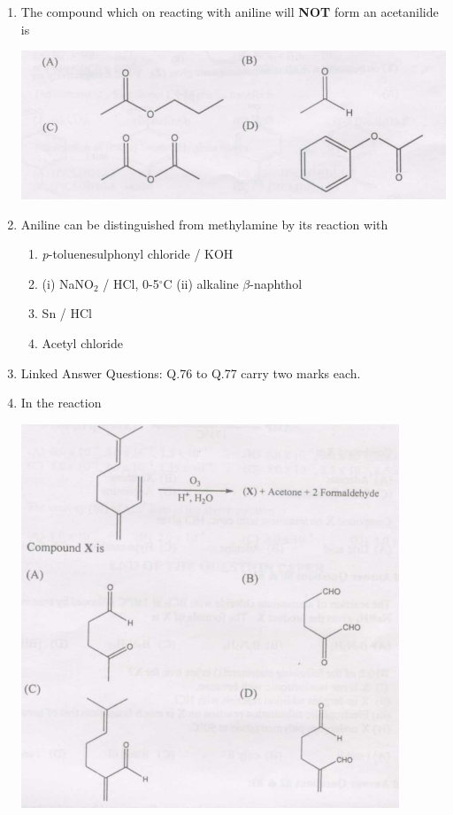 \documentclass[journal,12pt,onecolumn]{IEEEtran}
\theoremstyle{remark}
\begin{document}
\begin{enumerate}
\item  The compound which on reacting with aniline will \textbf{NOT} form an acetanilide is \hfill{}

\includegraphics[scale=1]{figs/image13.png}
  

\item  Aniline can be distinguished from methylamine by its reaction with \hfill{}

\begin{multicols}{2}
\begin{enumerate}[label=(\Alph*)]
\item \textit{p}-toluenesulphonyl chloride / KOH
\item (i) NaNO$_2$ / HCl, 0-5$^\circ$C \quad (ii) alkaline $\beta$-naphthol
\item Sn / HCl
\item Acetyl chloride
\end{enumerate}
\end{multicols}

\item{Linked Answer Questions: Q.76 to Q.77 carry two marks each.}

\item  In the reaction \hfill{}

\includegraphics[scale=1.2]{figs/image14.png}
  


\end{enumerate}
\end{document}
